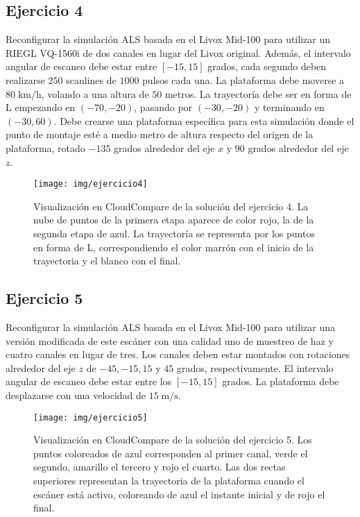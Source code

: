 \documentclass[]{article}
\begin{document}
	\subsection*{Ejercicio 4}
	Reconfigurar la simulación ALS basada en el Livox Mid-100 para utilizar un RIEGL VQ-1560i de dos canales en lugar del Livox original. Además, el intervalo angular de escaneo debe estar entre $[-15, 15]$ grados, cada segundo deben realizarse $250$ scanlines de $1000$ pulsos cada una. La plataforma debe moverse a $80\;\mathrm{km}/\mathrm{h}$, volando a una altura de $50$ metros. La trayectoría debe ser en forma de L empezando en $(-70, -20)$, pasando por $(-30, -20)$ y terminando en $(-30, 60)$. Debe crearse una plataforma específica para esta simulación donde el punto de montaje esté a medio metro de altura respecto del origen de la plataforma, rotado $-135$ grados alrededor del eje $x$ y $90$ grados alrededor del eje $z$.

	\begin{figure}[htb]
		\centering
		\texttt{[image: img/ejercicio4]}
		\caption{Visualización en CloudCompare de la solución del ejercicio 4. La nube de puntos de la primera etapa aparece de color rojo, la de la segunda etapa de azul. La trayectoría se representa por los puntos en forma de L, correspondiendo el color marrón con el inicio de la trayectoria y el blanco con el final.}
		\label{fig:ejercicio4}
	\end{figure} 
	
	\pagebreak
	
	
	\subsection*{Ejercicio 5}
	Reconfigurar la simulación ALS basada en el Livox Mid-100 para utilizar una versión modificada de este escáner con una calidad uno de muestreo de haz y cuatro canales en lugar de tres. Los canales deben estar montados con rotaciones alrededor del eje $z$ de $-45, -15, 15$ y $45$ grados, respectivamente. El intervalo angular de escaneo debe estar entre los $[-15, 15]$ grados. La plataforma debe desplazarse con una velocidad de $15\;\mathrm{m}/\mathrm{s}$.
	
	\begin{figure}[htb]
		\centering
		\texttt{[image: img/ejercicio5]}
		\caption{Visualización en CloudCompare de la solución del ejercicio 5. Los puntos coloreados de azul corresponden al primer canal, verde el segundo, amarillo el tercero y rojo el cuarto. Las dos rectas superiores representan la trayectoria de la plataforma cuando el escáner está activo, coloreando de azul el instante inicial y de rojo el final.}
		\label{fig:ejercicio5}
	\end{figure} 


	
\end{document}
